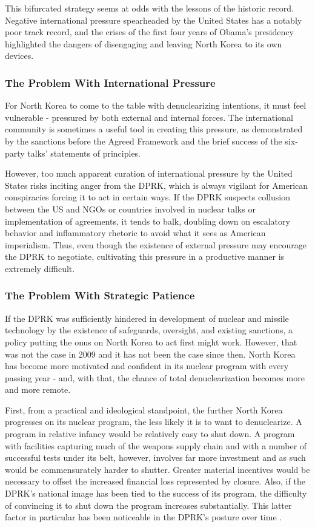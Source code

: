 \documentclass{article}
\begin{document}
This bifurcated strategy seems at odds with the lessons of the historic record. Negative international pressure spearheaded by the United States has a notably poor track record, and the crises of the first four years of Obama's presidency highlighted the dangers of disengaging and leaving North Korea to its own devices.

\subsubsection{The Problem With International Pressure}

For North Korea to come to the table with denuclearizing intentions, it must feel vulnerable - pressured by both external and internal forces. The international community is sometimes a useful tool in creating this pressure, as demonstrated by the sanctions before the Agreed Framework and the brief success of the six-party talks' statements of principles. 

However, too much apparent curation of international pressure by the United States risks inciting anger from the DPRK, which is always vigilant for American conspiracies forcing it to act in certain ways. If the DPRK suspects collusion between the US and NGOs or countries involved in nuclear talks or implementation of agreements, it tends to balk, doubling down on escalatory behavior and inflammatory rhetoric to avoid what it sees as American imperialism. Thus, even though the existence of external pressure may encourage the DPRK to negotiate, cultivating this pressure in a productive manner is extremely difficult.

\subsubsection{The Problem With Strategic Patience}

If the DPRK was sufficiently hindered in development of nuclear and missile technology by the existence of safeguards, oversight, and existing sanctions, a policy putting the onus on North Korea to act first might work. However, that was not the case in 2009 and it has not been the case since then. North Korea has become more motivated and confident in its nuclear program with every passing year - and, with that, the chance of total denuclearization becomes more and more remote.

First, from a practical and ideological standpoint, the further North Korea progresses on its nuclear program, the less likely it is to want to denuclearize. A program in relative infancy would be relatively easy to shut down. A program with facilities capturing much of the weapons supply chain and with a number of successful tests under its belt, however, involves far more investment and as such would be commensurately harder to shutter. Greater material incentives would be necessary to offset the increased financial loss represented by closure. Also, if the DPRK's national image has been tied to the success of its program, the difficulty of convincing it to shut down the program increases substantially. This latter factor in particular has been noticeable in the DPRK's posture over time \cite{rich14,hecker2}.
\end{document}
